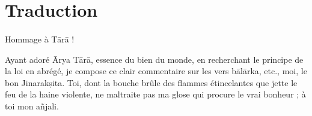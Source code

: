\documentclass[a4paper, 11pt, oneside, french]{article}
\begin{document}
\section{Traduction}
\paragraph{}
Hommage à T\={a}r\={a} !

\bigskip

Ayant adoré \={A}rya T\={a}r\={a}, essence du bien du monde, en recherchant le principe de la loi en abrégé, je compose ce clair commentaire sur les vers b\={a}l\={a}rka, etc., moi, le bon Jinarak\d{s}ita. Toi, dont la bouche brûle des flammes étincelantes que jette le feu de la haine violente, ne maltraite pas ma glose qui procure le vrai bonheur ; à toi mon a\~{n}jali.
\end{document}
